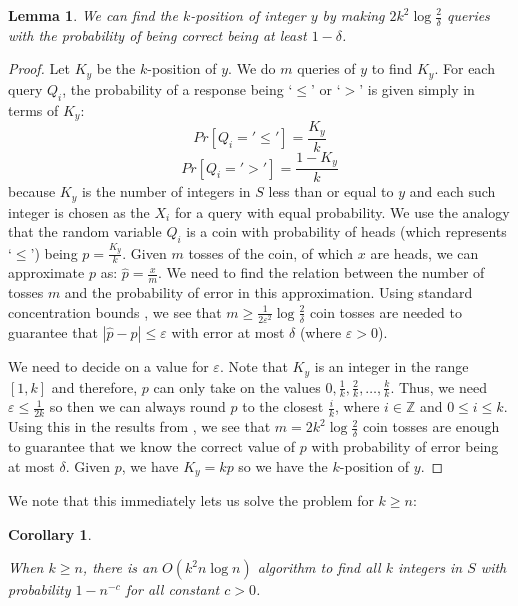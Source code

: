 \documentclass[12pt]{article}
\newtheorem{lemma}[theorem]{Lemma}
\newtheorem{corollary}[theorem]{Corollary}
\begin{document}
\begin{lemma} \label{lem:cointoss}
We can find the $k$-position of integer $y$ by making $2k^2\log{\frac{2}{\delta}}$ queries with the probability of being correct being at least $1-\delta$.
\end{lemma}

\begin{proof}
Let $K_y$ be the $k$-position of $y$. We do $m$ queries of $y$ to find $K_y$. For each query $Q_i$, the probability of a response being `$\leq$' or `$>$' is given simply in terms of $K_y$: $$Pr[Q_i = '\leq'] = \frac{K_y}{k}$$ $$Pr[Q_i = '>'] = \frac{1-K_y}{k}$$ because $K_y$ is the number of integers in $S$ less than or equal to $y$ and each such integer is chosen as the $X_i$ for a query with equal probability. We use the analogy that the random variable $Q_i$ is a coin with probability of heads (which represents `$\leq$') being $p = \frac{K_y}{k}$. Given $m$ tosses of the coin, of which $x$ are heads, we can approximate $p$ as: $\hat{p} = \frac{x}{m}$. We need to find the relation between the number of tosses $m$ and the probability of error in this approximation. Using standard concentration bounds \cite{Raginsky}, we see that $m \geq \frac{1}{2\varepsilon^2}\log{\frac{2}{\delta}}$ coin tosses are needed to guarantee that $|\hat{p}-p| \leq \varepsilon$ with error at most $\delta$ (where $\varepsilon > 0$). 

We need to decide on a value for $\varepsilon$. Note that $K_y$ is an integer in the range $[1, k]$ and therefore, $p$ can only take on the values $0, \frac{1}{k}, \frac{2}{k}, \ldots, \frac{k}{k}$. Thus, we need $\varepsilon \leq \frac{1}{2k}$ so then we can always round $\hat{p}$ to the closest $\frac{i}{k}$, where $i \in \mathbb{Z}$ and $0 \leq i \leq k$. Using this in the results from \cite{Raginsky}, we see that $m = 2k^2\log{\frac{2}{\delta}}$ coin tosses are enough to guarantee that we know the correct value of $p$ with probability of error being at most $\delta$. Given $p$, we have $K_y = kp$ so we have the $k$-position of $y$. 
\end{proof}

We note that this immediately lets us solve the problem for $k \geq n$:

\begin{corollary} \label{cor:bigksolution}

When $k \geq n$, there is an $O(k^2 n \log{n})$ algorithm to find all $k$ integers in $S$ with probability $1-n^{-c}$ for all constant $c>0$.

\end{corollary}
\end{document}
